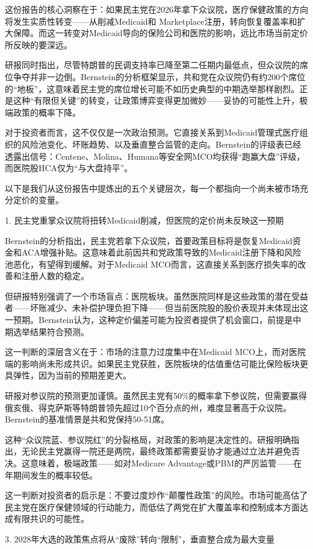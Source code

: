 \documentclass[11pt]{ctexart}
\begin{document}
这份报告的核心洞察在于：如果民主党在2026年拿下众议院，医疗保健政策的方向将发生实质性转变——从削减Medicaid和 Marketplace注册，转向恢复覆盖率和扩大保障。而这一转变对Medicaid导向的保险公司和医院的影响，远比市场当前定价所反映的要深远。

研报同时指出，尽管特朗普的民调支持率已降至第二任期内最低点，但众议院的席位争夺并非一边倒。Bernstein的分析框架显示，共和党在众议院仍有约200个席位的“地板”，这意味着民主党的席位增长可能不如历史典型的中期选举那样剧烈。正是这种“有限但关键”的转变，让政策博弈变得更加微妙——妥协的可能性上升，极端政策的概率下降。

对于投资者而言，这不仅仅是一次政治预测。它直接关系到Medicaid管理式医疗组织的风险池变化、坏账趋势、以及垂直整合监管的走向。Bernstein的评级表已经透露出信号：Centene、Molina、Humana等安全网MCO均获得“跑赢大盘”评级，而医院股HCA仅为“与大盘持平”。

以下是我们从这份报告中提炼出的五个关键层次，每一个都指向一个尚未被市场充分定价的变量。

1. 民主党重掌众议院将扭转Medicaid削减，但医院的定价尚未反映这一预期

Bernstein的分析指出，民主党若拿下众议院，首要政策目标将是恢复Medicaid资金和ACA增强补贴。这意味着此前因共和党政策导致的Medicaid注册下降和风险池恶化，有望得到缓解。对于Medicaid MCO而言，这直接关系到医疗损失率的改善和注册人数的稳定。

但研报特别强调了一个市场盲点：医院板块。虽然医院同样是这些政策的潜在受益者——坏账减少、未补偿护理负担下降——但当前医院股的股价表现并未体现出这一预期。Bernstein认为，这种定价偏差可能为投资者提供了机会窗口，前提是中期选举结果符合预测。

这一判断的深层含义在于：市场的注意力过度集中在Medicaid MCO上，而对医院端的影响尚未形成共识。如果民主党获胜，医院板块的估值重估可能比保险板块更具弹性，因为当前的预期差更大。

研报对参议院的预测更加谨慎。虽然民主党有50\%的概率拿下参议院，但需要赢得俄亥俄、得克萨斯等特朗普领先超过10个百分点的州，难度显著高于众议院。Bernstein的基准情景是共和党保持50-51席。

这种“众议院蓝、参议院红”的分裂格局，对政策的影响是决定性的。研报明确指出，无论民主党赢得一院还是两院，最终政策都需要妥协才能通过立法并避免否决。这意味着，极端政策——如对Medicare Advantage或PBM的严厉监管——在 年期间发生的概率较低。

这一判断对投资者的启示是：不要过度炒作“颠覆性政策”的风险。市场可能高估了民主党在医疗保健领域的行动能力，而低估了两党在扩大覆盖率和控制成本方面达成有限共识的可能性。

3. 2028年大选的政策焦点将从“废除”转向“限制”，垂直整合成为最大变量
\end{document}
